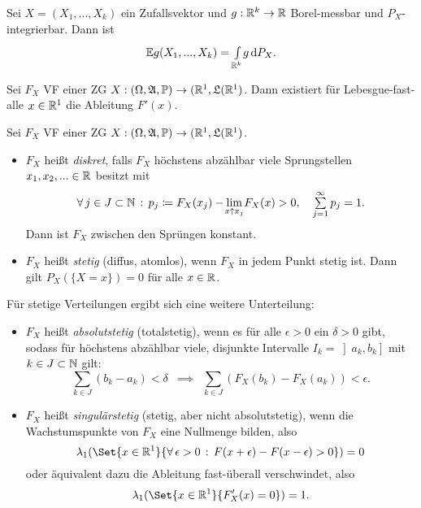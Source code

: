 \documentclass{cheat-sheet}
\newcommand{\Alg}{\mathfrak{A}} %
\newcommand{\LebAlg}{\mathfrak{L}} %
\renewcommand{\P}{\mathbb{P}} %
\newcommand{\E}{\mathbb{E}} %
\begin{document}
\begin{bem}
  Sei $X = (X_1, ..., X_k)$ ein Zufallsvektor und $g : \mathbb{R}^k \to \mathbb{R}$ Borel-messbar und $P_X$-integrierbar. Dann ist
  \[ \E g(X_1, ..., X_k) = \Int{\R^k}{}{g}{P_{X}}. \]
\end{bem}



\begin{satz}
  Sei $F_X$ VF einer ZG $X : (\Omega, \Alg, \P) \to (\R^1, \LebAlg(\R^1)$. Dann existiert für Lebesgue-fast-alle $x \in \mathbb{R}^1$ die Ableitung $F'(x)$.
\end{satz}

\begin{defn}
  Sei $F_X$ VF einer ZG $X : (\Omega, \Alg, \P) \to (\R^1, \LebAlg(\R^1)$.
  \begin{itemize}
    \item $F_X$ heißt \emph{diskret}, falls $F_X$ höchstens abzählbar viele Sprungstellen $x_1, x_2, ... \in \mathbb{R}$ besitzt mit
      \[ \fa{j \in J \subset \N} p_j \coloneqq F_X(x_j) - \lim_{\mathclap{x \uparrow x_j}} F_X(x) > 0, \quad \sum_{j=1}^\infty p_j = 1. \]
    Dann ist $F_X$ zwischen den Sprüngen konstant.
    \item $F_X$ heißt \emph{stetig} (diffus, atomlos), wenn $F_X$ in jedem Punkt stetig ist. Dann gilt $P_X(\{ X = x \}) = 0$ für alle $x \in \mathbb{R}$.
  \end{itemize}
  Für stetige Verteilungen ergibt sich eine weitere Unterteilung:
  \begin{itemize}
    \item $F_X$ heißt \emph{absolutstetig} (totalstetig), wenn es für alle $\epsilon > 0$ ein $\delta > 0$ gibt, sodass für höchstens abzählbar viele, disjunkte Intervalle $I_k = \left]a_k, b_k\right]$ mit $k \in J \subset \mathbb{N}$ gilt:
    \[ \sum_{k \in J} (b_k - a_k) < \delta \enspace \implies \enspace \sum_{k \in J} (F_X(b_k) - F_X(a_k)) < \epsilon. \]
    \item $F_X$ heißt \emph{singulärstetig} (stetig, aber nicht absolutstetig), wenn die Wachstumspunkte von $F_X$ eine Nullmenge bilden, also
    \[ \lambda_1(\Set{ x \in \R^1 }{ \fa{\epsilon > 0} F(x+\epsilon)- F(x-\epsilon) > 0 }) = 0 \]
    oder äquivalent dazu die Ableitung fast-überall verschwindet, also
    \[ \lambda_1(\Set{ x \in \R^1 }{ F_X'(x) = 0 }) = 1. \]
  \end{itemize}
\end{defn}
\end{document}
